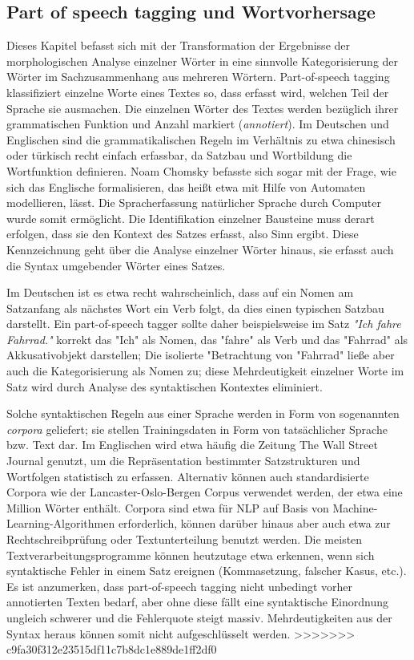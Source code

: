 \documentclass[12pt]{article}
\begin{document}
\subsection{Part of speech tagging und Wortvorhersage}
Dieses Kapitel befasst sich mit der Transformation der Ergebnisse der morphologischen Analyse einzelner Wörter in eine sinnvolle Kategorisierung der Wörter im Sachzusammenhang aus mehreren Wörtern. Part-of-speech tagging klassifiziert einzelne Worte eines Textes so, dass erfasst wird, welchen Teil der Sprache sie ausmachen. Die einzelnen Wörter des Textes werden bezüglich ihrer grammatischen Funktion und Anzahl markiert (\textit{annotiert}). Im Deutschen und Englischen sind die grammatikalischen Regeln im Verhältnis zu etwa chinesisch oder türkisch recht einfach erfassbar, da Satzbau und Wortbildung die Wortfunktion definieren. Noam Chomsky befasste sich sogar mit der Frage, wie sich das Englische formalisieren, das heißt etwa mit Hilfe von Automaten modellieren, lässt. Die Spracherfassung natürlicher Sprache durch Computer wurde somit ermöglicht. Die Identifikation einzelner Bausteine muss derart erfolgen, dass sie den Kontext des Satzes erfasst, also Sinn ergibt. Diese Kennzeichnung geht über die Analyse einzelner Wörter hinaus, sie erfasst auch die Syntax umgebender Wörter eines Satzes. 

Im Deutschen ist es etwa recht wahrscheinlich, dass auf ein Nomen am Satzanfang als nächstes Wort ein Verb folgt, da dies einen typischen Satzbau darstellt. Ein part-of-speech tagger sollte daher beispielsweise im Satz \textit{"Ich fahre Fahrrad."} korrekt das "Ich" als Nomen, das "fahre" als Verb und das "Fahrrad" als Akkusativobjekt darstellen; Die isolierte "Betrachtung von "Fahrrad" ließe aber auch die Kategorisierung als Nomen zu; diese Mehrdeutigkeit einzelner Worte im Satz wird durch Analyse des syntaktischen Kontextes eliminiert.

Solche syntaktischen Regeln aus einer Sprache werden in Form von sogenannten \textit{corpora} geliefert; sie stellen Trainingsdaten in Form von tatsächlicher Sprache bzw. Text dar. Im Englischen wird etwa häufig die Zeitung The Wall Street Journal genutzt, um die Repräsentation bestimmter Satzstrukturen und Wortfolgen statistisch zu erfassen. Alternativ können auch standardisierte Corpora wie der Lancaster-Oslo-Bergen Corpus verwendet werden, der etwa eine Million Wörter enthält. Corpora sind etwa für NLP auf Basis von Machine-Learning-Algorithmen erforderlich, können darüber hinaus aber auch etwa zur Rechtschreibprüfung oder Textunterteilung benutzt werden. Die meisten Textverarbeitungsprogramme können heutzutage etwa erkennen, wenn sich syntaktische Fehler in einem Satz ereignen (Kommasetzung, falscher Kasus, etc.). Es ist anzumerken, dass part-of-speech tagging nicht unbedingt vorher annotierten Texten bedarf, aber ohne diese fällt eine syntaktische Einordnung ungleich schwerer und die Fehlerquote steigt massiv. Mehrdeutigkeiten aus der Syntax heraus können somit nicht aufgeschlüsselt werden. 
>>>>>>> c9fa30f312e23515df11c7b8dc1e889de1ff2df0
\end{document}
